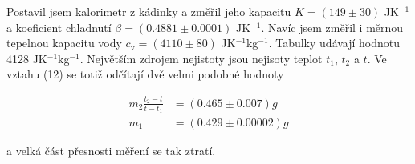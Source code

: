 \documentclass[a4paper,11pt]{article}
\begin{document}
Postavil jsem kalorimetr z kádinky a změřil jeho kapacitu $K = (149 \pm 30)$ JK$^{-1}$ a koeficient chladnutí $\beta = (0.4881 \pm 0.0001)$ JK$^{-1}$. Navíc jsem změřil i měrnou tepelnou kapacitu vody $c_{\text{v}} = (4110 \pm 80)$ JK$^{-1}$kg$^{-1}$. Tabulky udávají hodnotu 4128 JK$^{-1}$kg$^{-1}$. Největším zdrojem nejistoty jsou nejisoty teplot $t_1$, $t_2$ a $t$. Ve vztahu (12) se totiž odčítají dvě velmi podobné hodnoty 

\begin{align*}
  m_2 \frac{t_2 - t}{t - t_1} &= (0.465 \pm 0.007) g \\
  m_1 &= (0.429 \pm 0.00002) g
\end{align*}

\noindent
a velká část přesnosti měření se tak ztratí.
\end{document}
